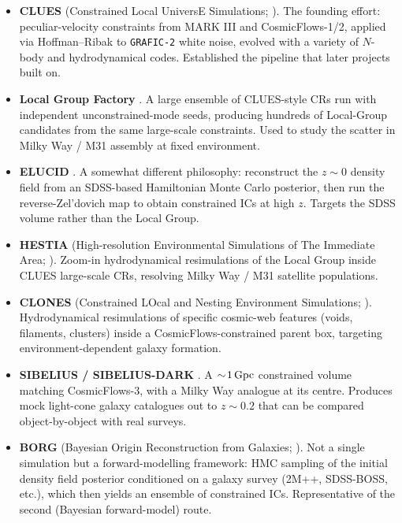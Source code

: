 \documentclass[12pt]{article}
\begin{document}
\begin{itemize}
  \item \textbf{CLUES} (Constrained Local UniversE Simulations;
        \citealt{Gottloeber2010,Yepes2014}).  The founding effort:
        peculiar-velocity constraints from MARK III and CosmicFlows-1/2,
        applied via Hoffman--Ribak to \texttt{GRAFIC-2} white noise,
        evolved with a variety of $N$-body and hydrodynamical codes.
        Established the pipeline that later projects built on.
  \item \textbf{Local Group Factory} \citep{Carlesi2016}.  A large
        ensemble of CLUES-style CRs run with independent
        unconstrained-mode seeds, producing hundreds of Local-Group
        candidates from the same large-scale constraints.  Used to
        study the scatter in Milky Way / M31 assembly at fixed
        environment.
  \item \textbf{ELUCID} \citep{Wang2016}.  A somewhat different
        philosophy: reconstruct the $z\!\sim\!0$ density field from an
        SDSS-based Hamiltonian Monte Carlo posterior, then run the
        reverse-Zel'dovich map to obtain constrained ICs at high $z$.
        Targets the SDSS volume rather than the Local Group.
  \item \textbf{HESTIA} (High-resolution Environmental Simulations of
        The Immediate Area; \citealt{Libeskind2020}).  Zoom-in
        hydrodynamical resimulations of the Local Group inside CLUES
        large-scale CRs, resolving Milky Way / M31 satellite
        populations.
  \item \textbf{CLONES} (Constrained LOcal and Nesting Environment
        Simulations; \citealt{Sorce2021}).  Hydrodynamical
        resimulations of specific cosmic-web features (voids,
        filaments, clusters) inside a CosmicFlows-constrained parent
        box, targeting environment-dependent galaxy formation.
  \item \textbf{SIBELIUS / SIBELIUS-DARK}
        \citep{Sawala2022,McAlpine2022}.  A $\sim\!1\,{\rm Gpc}$
        constrained volume matching CosmicFlows-3, with a Milky Way
        analogue at its centre.  Produces mock light-cone galaxy
        catalogues out to $z\!\sim\!0.2$ that can be compared
        object-by-object with real surveys.
  \item \textbf{BORG} (Bayesian Origin Reconstruction from Galaxies;
        \citealt{JascheWandelt2013}).  Not a single simulation but a
        forward-modelling framework: HMC sampling of the initial
        density field posterior conditioned on a galaxy survey (2M++,
        SDSS-BOSS, etc.), which then yields an ensemble of constrained
        ICs.  Representative of the second (Bayesian forward-model)
        route.
\end{itemize}
\end{document}
